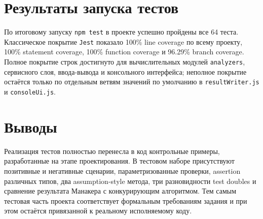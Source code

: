 \section{Результаты запуска тестов} \label{ch4:sec6}

По итоговому запуску \texttt{npm test} в проекте успешно пройдены все 64 теста.
Классическое покрытие \texttt{Jest} показало 100\% line coverage по всему проекту, 100\% statement coverage, 100\% function coverage и 96.29\% branch coverage.
Полное покрытие строк достигнуто для вычислительных модулей \texttt{analyzers}, сервисного слоя, ввода-вывода и консольного интерфейса; неполное покрытие остаётся только по отдельным ветвям значений по умолчанию в \texttt{resultWriter.js} и \texttt{consoleUi.js}.

\section{Выводы} \label{ch4:conclusion}

Реализация тестов полностью перенесла в код контрольные примеры, разработанные на этапе проектирования.
В тестовом наборе присутствуют позитивные и негативные сценарии, параметризованные проверки, assertion различных типов, два assumption-style метода, три разновидности test doubles и сравнение результата Манакера с конкурирующим алгоритмом.
Тем самым тестовая часть проекта соответствует формальным требованиям задания и при этом остаётся привязанной к реальному исполняемому коду.

